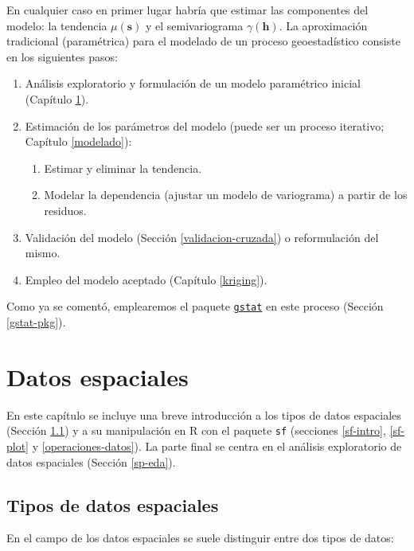 \documentclass[
]{book}
\theoremstyle{break}
\theoremstyle{definition}
\theoremstyle{definition}
\theoremstyle{definition}
\theoremstyle{definition}
\theoremstyle{remark}
\begin{document}
En cualquier caso en primer lugar habría que estimar las componentes del modelo: la tendencia \(\mu(\mathbf{s})\) y el semivariograma \(\gamma(\mathbf{h})\).
La aproximación tradicional (paramétrica) para el modelado de un proceso geoestadístico consiste en los siguientes pasos:

\begin{enumerate}
\def\labelenumi{\arabic{enumi}.}
\item
  Análisis exploratorio y formulación de un modelo paramétrico inicial (Capítulo \ref{datos}).
\item
  Estimación de los parámetros del modelo (puede ser un proceso iterativo; Capítulo \ref{modelado}):

  \begin{enumerate}
  \def\labelenumii{\arabic{enumii}.}
  \item
    Estimar y eliminar la tendencia.
  \item
    Modelar la dependencia (ajustar un modelo de variograma) a partir de los residuos.
  \end{enumerate}
\item
  Validación del modelo (Sección \ref{validacion-cruzada}) o reformulación del mismo.
\item
  Empleo del modelo aceptado (Capítulo \ref{kriging}).
\end{enumerate}

Como ya se comentó, emplearemos el paquete \href{https://r-spatial.github.io/gstat}{\texttt{gstat}} en este proceso (Sección \ref{gstat-pkg}).

\chapter{Datos espaciales}\label{datos}

En este capítulo se incluye una breve introducción a los tipos de datos espaciales (Sección \ref{datos-tipos}) y a su manipulación en R con el paquete \texttt{sf} (secciones \ref{sf-intro}, \ref{sf-plot} y \ref{operaciones-datos}).
La parte final se centra en el análisis exploratorio de datos espaciales (Sección \ref{sp-eda}).

\section{Tipos de datos espaciales}\label{datos-tipos}

En el campo de los datos espaciales se suele distinguir entre dos tipos de datos:
\end{document}
